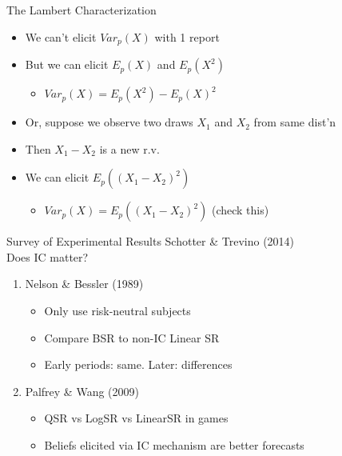 \begin{frame}{The Lambert Characterization}
    \begin{itemize}
        \item We can't elicit $Var_p(X)$ with 1 report
        \item But we can elicit $E_p(X)$ and $E_p(X^2)$ 
        \begin{itemize}
            \item $Var_p(X) = E_p(X^2) - E_p(X)^2$
        \end{itemize}
        \item Or, suppose we observe two draws $X_1$ and $X_2$ from same dist'n
        \item Then $X_1-X_2$ is a new r.v.
        \item We can elicit $E_p((X_1-X_2)^2)$
            \begin{itemize}
                \item $Var_p(X) = E_p((X_1-X_2)^2)$ (check this)
            \end{itemize}
    \end{itemize}
\end{frame}

\begin{frame}{Survey of Experimental Results}
    Schotter \& Trevino (2014)\\
    Does IC matter?
    \begin{enumerate}
        \item Nelson \& Bessler (1989)
        \begin{itemize}
            \item Only use risk-neutral subjects
            \item Compare BSR to non-IC Linear SR
            \item Early periods: same. Later: differences
        \end{itemize}
        \item Palfrey \& Wang (2009)
        \begin{itemize}
            \item QSR vs LogSR vs LinearSR in games
            \item Beliefs elicited via IC mechanism are better forecasts
        \end{itemize}
    \end{enumerate}
\end{frame}

